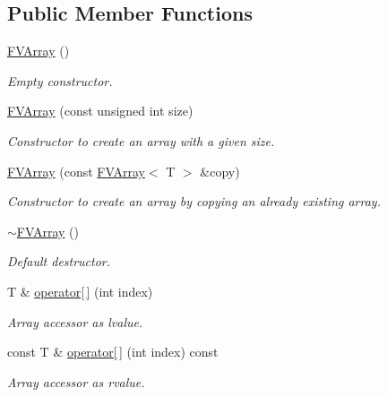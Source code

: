 \subsection*{Public Member Functions}
\begin{DoxyCompactItemize}
\item 
\hyperlink{classFVL_1_1FVArray_a8e9757267692cc252f1617d5b0f45047}{FVArray} ()
\begin{DoxyCompactList}\small\item\em Empty constructor. \item\end{DoxyCompactList}\item 
\hyperlink{classFVL_1_1FVArray_aa561520ffeba251ff13b97e6507e9356}{FVArray} (const unsigned int size)
\begin{DoxyCompactList}\small\item\em Constructor to create an array with a given size. \item\end{DoxyCompactList}\item 
\hyperlink{classFVL_1_1FVArray_a47404d96b43a8511ebbc2ddd4fbd8752}{FVArray} (const \hyperlink{classFVL_1_1FVArray}{FVArray}$<$ T $>$ \&copy)
\begin{DoxyCompactList}\small\item\em Constructor to create an array by copying an already existing array. \item\end{DoxyCompactList}\item 
\hyperlink{classFVL_1_1FVArray_a0158998b288980980fbd934dd00ba55b}{$\sim$FVArray} ()
\begin{DoxyCompactList}\small\item\em Default destructor. \item\end{DoxyCompactList}\item 
T \& \hyperlink{classFVL_1_1FVArray_a2d4b36a43041d6505f82836a6aeccd52}{operator\mbox{[}$\,$\mbox{]}} (int index)
\begin{DoxyCompactList}\small\item\em Array accessor as lvalue. \item\end{DoxyCompactList}\item 
const T \& \hyperlink{classFVL_1_1FVArray_a56e773dcafc33b12d2b27d2c7a174f3a}{operator\mbox{[}$\,$\mbox{]}} (int index) const 
\begin{DoxyCompactList}\small\item\em Array accessor as rvalue. \item\end{DoxyCompactList}\item 

\end{DoxyCompactItemize}
